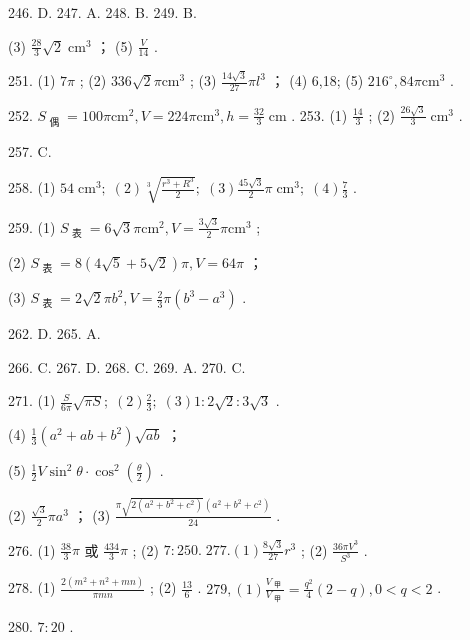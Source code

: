 \documentclass[10pt]{article}
\begin{document}
246. D. 247. A. 248. B. 249. B.

(3) \(\frac{28}{3}\sqrt{2}{\mathrm{\;{cm}}}^{3}\) ； (5) \(\frac{V}{14}\) .

251. (1) \({7\pi }\) ; (2) \({336}\sqrt{2}\pi {\mathrm{{cm}}}^{3}\) ; (3) \(\frac{{14}\sqrt{3}}{27}\pi {l}^{3}\) ； (4) 6,18; (5) \({216}^{ \circ  },{84\pi }{\mathrm{{cm}}}^{3}\) .

252. \({S}_{\text{ 偶 }} = {100\pi }{\mathrm{{cm}}}^{2},V = {224\pi }{\mathrm{{cm}}}^{3},h = \frac{32}{3}\mathrm{\;{cm}}\) . 253. (1) \(\frac{14}{3}\) ; (2) \(\frac{{26}\sqrt{3}}{3}{\mathrm{\;{cm}}}^{3}\) .

257. C.

258. (1) \({54}{\mathrm{\;{cm}}}^{3};\;\left( 2\right) \sqrt[3]{\frac{{r}^{3} + {R}^{3}}{2}};\;\left( 3\right) \frac{{45}\sqrt{3}}{2}\pi {\mathrm{\;{cm}}}^{3};\;\left( 4\right) \frac{7}{3}\) .

259. (1) \({S}_{\text{ 表 }} = 6\sqrt{3}\pi {\mathrm{{cm}}}^{2},V = \frac{3\sqrt{3}}{2}\pi {\mathrm{{cm}}}^{3}\) ;

(2) \({S}_{\text{ 表 }} = 8\left( {4\sqrt{5} + 5\sqrt{2}}\right) \pi ,V = {64\pi }\) ；

(3) \({S}_{\text{ 表 }} = 2\sqrt{2}\pi {b}^{2},V = \frac{2}{3}\pi \left( {{b}^{3} - {a}^{3}}\right)\) .

262. D. 265. A.

266. C. 267. D. 268. C. 269. A. 270. C.

271. (1) \(\frac{S}{6\pi }\sqrt{\pi S};\;\left( 2\right) \frac{2}{3};\;\left( 3\right) 1 : 2\sqrt{2} : 3\sqrt{3}\) .

(4) \(\frac{1}{3}\left( {{a}^{2} + {ab} + {b}^{2}}\right) \sqrt{ab}\) ；

(5) \(\frac{1}{2}V{\sin }^{2}\theta  \cdot  {\cos }^{2}\left( \frac{\theta }{2}\right)\) .

(2) \(\frac{\sqrt{3}}{2}\pi {a}^{3}\) ； (3) \(\frac{\pi \sqrt{2\left( {{a}^{2} + {b}^{2} + {c}^{2}}\right) }\left( {{a}^{2} + {b}^{2} + {c}^{2}}\right) }{24}\) .

276. (1) \(\frac{38}{3}\pi\) 或 \(\frac{434}{3}\pi\) ; (2) \(7 : {250}.\;{277}.\left( 1\right) \frac{8\sqrt{3}}{27}{r}^{3}\) ; (2) \(\frac{{36\pi }{V}^{3}}{{S}^{3}}\) .

278. (1) \(\frac{2\left( {{m}^{2} + {n}^{2} + {mn}}\right) }{\pi mn}\) ; (2) \(\frac{13}{6}\) . \({279},\left( 1\right) \frac{{V}_{\text{ 甲 }}}{{V}_{\text{ 甲 }}} = \frac{{q}^{2}}{4}\left( {2 - q}\right) ,0 < q < 2\) .

280. \(7 : {20}\) .
\end{document}
